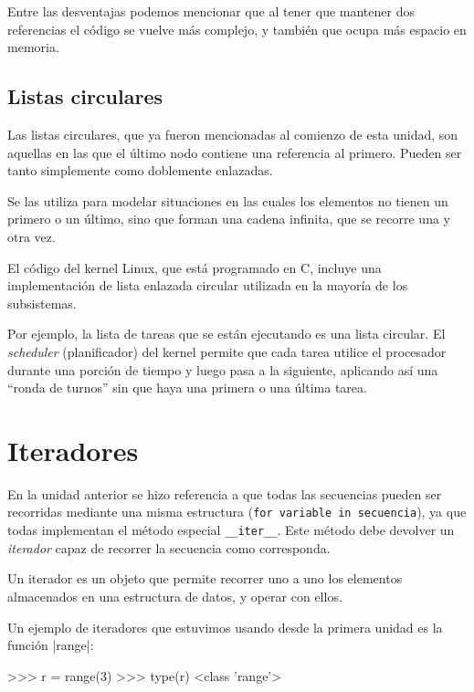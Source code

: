 Entre las desventajas podemos mencionar que al tener que mantener dos
referencias el código se vuelve más complejo, y también que ocupa más
espacio en memoria.

\subsection*{Listas circulares}

Las listas circulares, que ya fueron mencionadas al comienzo de esta
unidad, son aquellas en las que el último nodo contiene una referencia al
primero.  Pueden ser tanto simplemente como doblemente enlazadas.

Se las utiliza para modelar situaciones en las cuales los elementos no
tienen un primero o un último, sino que forman una cadena infinita, que se
recorre una y otra vez.

\begin{sabias_que}
El código del kernel Linux, que está programado en C, incluye una
implementación de lista enlazada circular utilizada en la mayoría de los
subsistemas.

Por ejemplo, la lista de tareas que se están ejecutando es una lista
circular.  El {\it scheduler} (planificador) del kernel permite que cada tarea
utilice el procesador durante una porción de tiempo y luego pasa a la
siguiente, aplicando así una ``ronda de turnos'' sin que haya una primera o una
última tarea.
\end{sabias_que}

\section{Iteradores}

En la unidad anterior se hizo referencia a que todas las secuencias
pueden ser recorridas mediante una misma estructura
(\lstinline!for variable in secuencia!), ya que todas implementan el método
especial \lstinline!__iter__!.  Este método debe devolver un {\it iterador}
capaz de recorrer la secuencia como corresponda.

\begin{observacion}
Un iterador es un objeto que permite recorrer uno a uno los elementos
almacenados en una estructura de datos, y operar con ellos.
\end{observacion}

Un ejemplo de iteradores que estuvimos usando desde la primera unidad es la
función |range|:

\begin{codigo-python-sn}
>>> r = range(3)
>>> type(r)
<class 'range'>
\end{codigo-python-sn}

